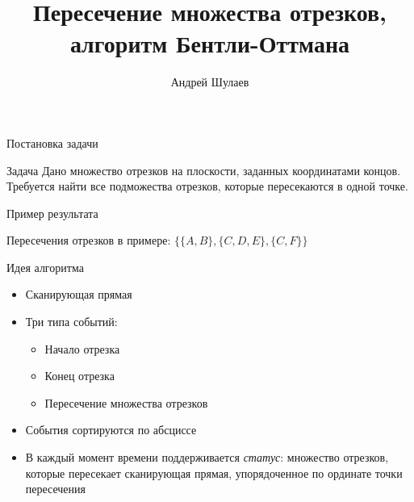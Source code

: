 \documentclass{beamer}
\title[Бентли-Оттман]{Пересечение множества отрезков, алгоритм Бентли-Оттмана}
\author[Андрей Шулаев]{Андрей Шулаев}
\institute[НИУ ИТМО]{Национальный исследовательский университет ИТ, механики и оптики}
\begin{document}
\frame[label=title]{\titlepage}

\begin{frame}{Постановка задачи}
\begin{block}{Задача}
Дано множество отрезков на плоскости, заданных координатами концов. Требуется найти все подможества отрезков, которые пересекаются в одной точке.
\end{block}
\end{frame}

\begin{frame}{Пример результата}
\begin{center}

Пересечения отрезков в примере: $\{\{A, B\}, \{C, D, E\}, \{C, F\}\}$
\end{center}
\end{frame}


\begin{frame}{Идея алгоритма}
\begin{itemize}
\pause \item Сканирующая прямая
\pause \item Три типа событий:
\begin{itemize}
\item Начало отрезка
\item Конец отрезка
\item Пересечение множества отрезков
\end{itemize}
\pause \item События сортируются по абсциссе
\pause \item В каждый момент времени поддерживается \emph{статус}: множество отрезков, которые пересекает сканирующая прямая, упорядоченное по ординате точки пересечения
\end{itemize}
\end{frame}
\end{document}
